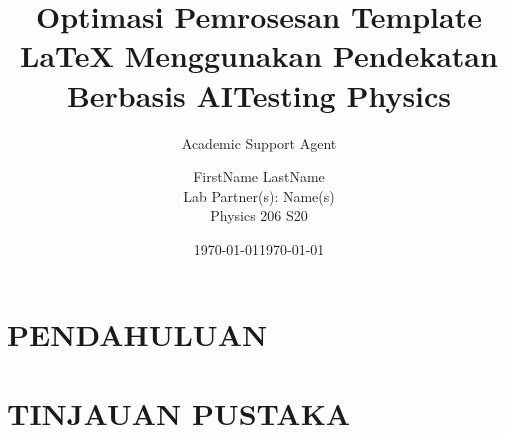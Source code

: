 \documentclass{article}
\title{Optimasi Pemrosesan Template LaTeX Menggunakan Pendekatan Berbasis AI}
\author{Academic Support Agent}
\date{\today}
\begin{document}
\maketitle

\begin{abstract}

\end{abstract}

\chapter{PENDAHULUAN}


\chapter{TINJAUAN PUSTAKA}


\usepackage{graphicx}
\usepackage{amsmath,amssymb}
\usepackage{hyperref} %
\hypersetup{colorlinks=true, urlcolor=blue, linkcolor=blue, citecolor=red} %

\usepackage{lipsum} %
\graphicspath{{Figures/}}

\title{Testing Physics}
\author{FirstName LastName\\
Lab Partner(s): Name(s)\\
Physics 206 S20}
\date{\today}
\end{document}
